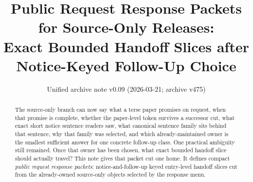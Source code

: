 \documentclass[11pt]{article}
\title{Public Request Response Packets for Source-Only Releases:\\[0.5ex]
\large Exact Bounded Handoff Slices after Notice-Keyed Follow-Up Choice}
\author{}
\date{Unified archive note v0.09 (2026-03-21; archive v475)}
\begin{document}
\maketitle

\begin{abstract}
The source-only branch can now say what a terse paper promises on request, when that promise is complete, whether the paper-level token survives a successor cut, what exact short notice sentence readers saw, what canonical sentence family sits behind that sentence, why that family was selected, and which already-maintained owner is the smallest sufficient answer for one concrete follow-up class.
One practical ambiguity still remained.
Once that owner has been chosen, what exact bounded handoff slice should actually travel?
This note gives that packet cut one home.
It defines compact \emph{public request response packets}: notice-and-follow-up keyed entry-level handoff slices cut from the already-owned source-only objects selected by the response menu.
\end{abstract}
\end{document}
